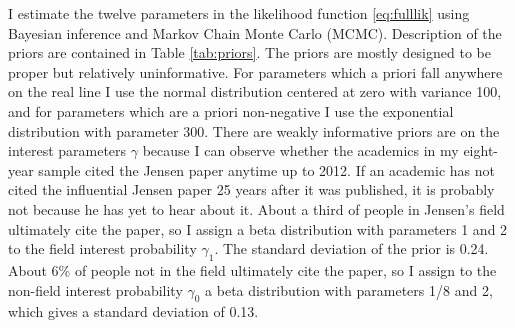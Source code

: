 I estimate the twelve parameters in the likelihood function \eqref{eq:fulllik}
using Bayesian inference and Markov Chain Monte Carlo (MCMC).  Description of the priors
are contained in Table \ref{tab:priors}.  The priors are mostly designed to be proper but 
relatively uninformative.  For parameters which a priori fall anywhere on the real line
I use the normal distribution centered at zero with variance 100, and for parameters which
are a priori non-negative I use the exponential distribution with parameter 300.\footnotemark{}
There are weakly informative priors are on the interest parameters $\gamma$ because I can
observe whether the academics in my eight-year sample cited the Jensen paper anytime up to
2012. If an academic has not cited the influential Jensen paper 25 years after it was
published, it is probably not because he has yet to hear about it.
About a third of people in Jensen's field ultimately cite the paper, so I assign a beta
distribution with parameters 1 and 2 to the field interest probability
$\gamma_1$. The standard deviation of the prior is 0.24. About 6\% of
people not in the field ultimately cite the paper, so I assign to the
non-field interest probability $\gamma_0$ a beta distribution with
parameters 1/8 and 2, which gives a standard deviation of 0.13.

